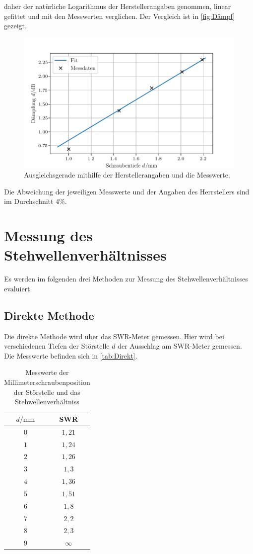 daher der natürliche Logarithmus der Herstellerangaben genommen, linear gefittet und mit den Messwerten verglichen. Der Vergleich ist in \autoref{fig:Dämpf} gezeigt.
\begin{figure}
    \centering
    \includegraphics[scale=0.7]{content/V53_pictures/dampfung.pdf}
    \caption{Ausgleichsgerade mithilfe der Herstellerangaben und die Messwerte.}
    \label{fig:Dämpf}
\end{figure}
Die Abweichung der jeweiligen Messwerte und der Angaben des Herrstellers sind im Durchschnitt $4 \%$.
\section{Messung des Stehwellenverhältnisses}
Es werden im folgenden drei Methoden zur Messung des Stehwellenverhältnisses evaluiert.
\subsection{Direkte Methode}

Die direkte Methode wird über das SWR-Meter gemessen. Hier wird bei verschiedenen Tiefen der Störstelle $d$ der Ausschlag am SWR-Meter gemessen. Die Messwerte befinden sich in \autoref{tab:Direkt}.
\begin{table}[htbp] 
    \centering 
    \begin{tabular}{c  c} 
        \toprule $d / \mathrm{mm}$  &  SWR  \\ 
        \midrule 
        $0$  &  $1,21$ \\
        $1$  &  $1,24$ \\
        $2$  &  $1,26$\\
        $3$  &  $1,3$\\
        $4$  &  $1,36$\\
        $5$  &  $1,51$\\
        $6$  &  $1,8$\\
        $7$  &  $2,2$\\
        $8$  &  $2,3$\\
        $9$  &  $\infty$\\
        \bottomrule 
    \end{tabular} 
    \caption[Tabelle]{Messwerte der Millimeterschraubenposition der Störstelle und das Stehwellenverhältniss} 
    \label{tab:Direkt} 
\end{table}

